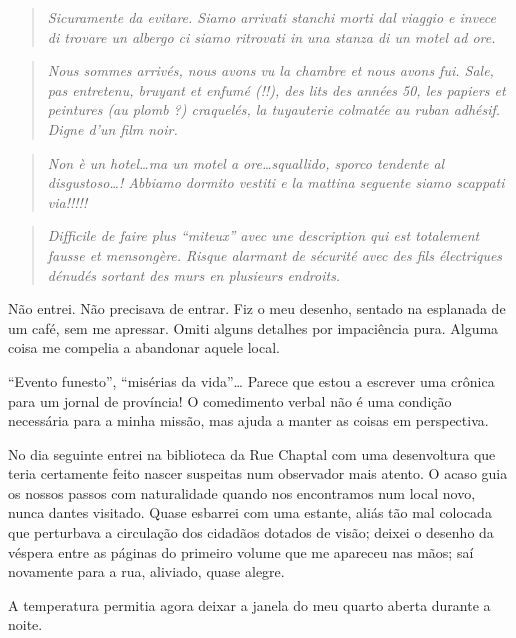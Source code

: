 \begin{quote}
\emph{Sicuramente da evitare. Siamo arrivati stanchi morti dal viaggio e
invece di trovare un albergo ci siamo ritrovati in una stanza di un
motel ad ore.}
\end{quote}

\begin{quote}
\emph{Nous sommes arrivés, nous avons vu la chambre et nous avons fui.
Sale, pas entretenu, bruyant et enfumé (!!), des lits des années 50, les
papiers et peintures (au plomb ?) craquelés, la tuyauterie colmatée au
ruban adhésif. Digne d'un film noir.}
\end{quote}

\begin{quote}
\emph{Non è un hotel\ldots{}ma un motel a ore\ldots{}squallido, sporco tendente
al disgustoso\ldots{}! Abbiamo dormito vestiti e la mattina seguente siamo
scappati via!!!!!}
\end{quote}

\begin{quote}
\emph{Difficile de faire plus ``miteux'' avec une description qui est
totalement fausse et mensongère. Risque alarmant de sécurité avec des
fils électriques dénudés sortant des murs en plusieurs endroits.}
\end{quote}

Não entrei. Não precisava de entrar. Fiz o meu desenho, sentado na
esplanada de um café, sem me apressar. Omiti alguns detalhes por
impaciência pura. Alguma coisa me compelia a abandonar aquele local.

``Evento funesto'', ``misérias da vida''\ldots{} Parece que estou a
escrever uma crônica para um jornal de província! O comedimento verbal
não é uma condição necessária para a minha missão, mas ajuda a manter as
coisas em perspectiva.

No dia seguinte entrei na biblioteca da Rue Chaptal com uma desenvoltura
que teria certamente feito nascer suspeitas num observador mais atento.
O acaso guia os nossos passos com naturalidade quando nos encontramos
num local novo, nunca dantes visitado. Quase esbarrei com uma estante,
aliás
tão mal colocada que perturbava a circulação dos cidadãos dotados de
visão; deixei o desenho da véspera entre as páginas do primeiro volume
que me apareceu nas mãos; saí novamente para a rua, aliviado, quase
alegre.

A temperatura permitia agora deixar a janela do meu quarto aberta
durante a noite.

